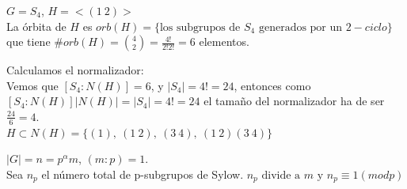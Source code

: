 \documentclass[nochap]{apuntes}
\begin{document}
\begin{example}
$G = S_4$, 
$H = <(1\ 2)>$\\
La órbita de $H$ es $orb(H) = \{ \text{los subgrupos de }S_4 \text{ generados por un } 2-ciclo \}$ que tiene $\#orb(H) = {4 \choose 2} = \frac{4!}{2!2!} = 6$ elementos.

Calculamos el normalizador:\\
Vemos que $[S_4:N(H)] = 6$, y $|S_4|=4!=24$, entonces como $[S_4:N(H)]|N(H)|=|S_4|=4!=24$ el tamaño del normalizador ha de ser $\frac{24}{6}=4$.\\
$H\subset N(H) = \{(1),\ (1\ 2),\ (3\ 4),\ (1\ 2)(3\ 4) \}$

\end{example}

\begin{theorem}
$|G| = n = p^{\alpha} m$, $(m:p) = 1$.\\
Sea $n_p$ el número total de p-subgrupos de Sylow.
$n_p \text{ divide a } m \text{ y }  n_p \equiv 1(mod p)$
\end{theorem}
\end{document}
